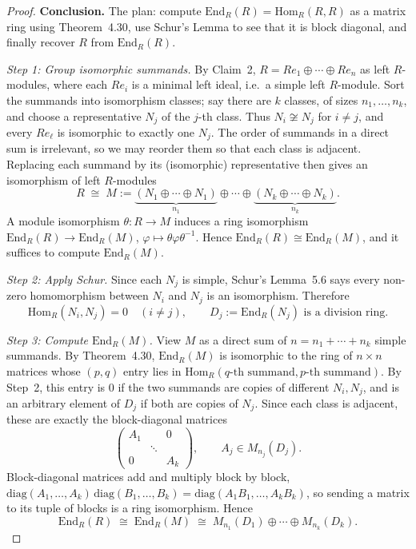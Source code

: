 \documentclass[12pt]{article}
\begin{document}
\begin{proof}
\medskip
\noindent\textbf{Conclusion.} The plan: compute $\mathrm{End}_R(R) = \mathrm{Hom}_R(R,R)$ as a matrix ring using Theorem~4.30, use Schur's Lemma to see that it is block diagonal, and finally recover $R$ from $\mathrm{End}_R(R)$.

\smallskip
\textit{Step 1: Group isomorphic summands.}
By Claim~2, $R = Re_1 \oplus \cdots \oplus Re_n$ as left $R$-modules, where each $Re_i$ is a minimal left ideal, i.e.\ a simple left $R$-module. Sort the summands into isomorphism classes; say there are $k$ classes, of sizes $n_1, \ldots, n_k$, and choose a representative $N_j$ of the $j$-th class. Thus $N_i \not\cong N_j$ for $i \neq j$, and every $Re_\ell$ is isomorphic to exactly one $N_j$. The order of summands in a direct sum is irrelevant, so we may reorder them so that each class is adjacent. Replacing each summand by its (isomorphic) representative then gives an isomorphism of left $R$-modules
\[
  R \;\cong\; M := \underbrace{(N_1 \oplus \cdots \oplus N_1)}_{n_1} \oplus \cdots \oplus \underbrace{(N_k \oplus \cdots \oplus N_k)}_{n_k}.
\]
A module isomorphism $\theta : R \to M$ induces a ring isomorphism $\mathrm{End}_R(R) \to \mathrm{End}_R(M)$, $\varphi \mapsto \theta\varphi\theta^{-1}$. Hence $\mathrm{End}_R(R) \cong \mathrm{End}_R(M)$, and it suffices to compute $\mathrm{End}_R(M)$.

\smallskip
\textit{Step 2: Apply Schur.}
Since each $N_j$ is simple, Schur's Lemma~5.6 says every non-zero homomorphism between $N_i$ and $N_j$ is an isomorphism. Therefore
\[
  \mathrm{Hom}_R(N_i, N_j) = 0 \quad (i \neq j), \qquad D_j := \mathrm{End}_R(N_j) \text{ is a division ring.}
\]

\smallskip
\textit{Step 3: Compute $\mathrm{End}_R(M)$.}
View $M$ as a direct sum of $n = n_1 + \cdots + n_k$ simple summands. By Theorem~4.30, $\mathrm{End}_R(M)$ is isomorphic to the ring of $n \times n$ matrices whose $(p,q)$ entry lies in $\mathrm{Hom}_R(\text{$q$-th summand}, \text{$p$-th summand})$. By Step~2, this entry is $0$ if the two summands are copies of different $N_i, N_j$, and is an arbitrary element of $D_j$ if both are copies of $N_j$. Since each class is adjacent, these are exactly the block-diagonal matrices
\[
  \begin{pmatrix}
    A_1 & & 0 \\
    & \ddots & \\
    0 & & A_k
  \end{pmatrix}, \qquad A_j \in M_{n_j}(D_j).
\]
Block-diagonal matrices add and multiply block by block, $\mathrm{diag}(A_1,\ldots,A_k)\,\mathrm{diag}(B_1,\ldots,B_k) = \mathrm{diag}(A_1B_1,\ldots,A_kB_k)$, so sending a matrix to its tuple of blocks is a ring isomorphism. Hence
\[
  \mathrm{End}_R(R) \;\cong\; \mathrm{End}_R(M) \;\cong\; M_{n_1}(D_1) \oplus \cdots \oplus M_{n_k}(D_k).
\]


\end{proof}
\end{document}
